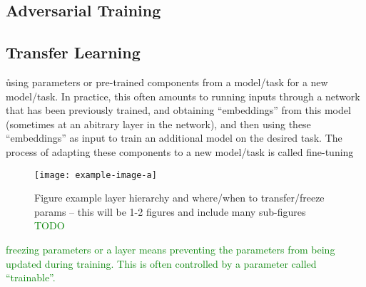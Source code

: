\subsection{Adversarial Training}



\subsection{Transfer Learning}







\r{using parameters or pre-trained components from a model/task for a new model/task.  In practice, this often amounts to running inputs through a network that has been previously trained, and obtaining ``embeddings'' from this model (sometimes at an abitrary layer in the network), and then using these ``embeddings'' as input to train an additional model on the desired task. The process of adapting these components to a new model/task is called fine-tuning}


\begin{figure}[htp]
	\centering
	\texttt{[image: example-image-a]}\hfil
	\caption{Figure example layer hierarchy and where/when to transfer/freeze params -- this will be 1-2 figures and include many sub-figures \textcolor{green}{TODO}}
	\label{fig:transfer_learning_subfigs_a}
\end{figure}

\textcolor{green}{{freezing} parameters or a layer means preventing the parameters from being updated during training. This is often controlled by a parameter called ``trainable''.}

